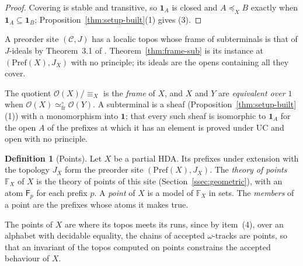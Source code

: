 \documentclass{lmcs}
\theoremstyle{definition}
\newtheorem{definition}[theorem]{Definition}
\theoremstyle{remark}
\newcommand{\Op}{\mathcal{O}}
\newcommand{\prin}[1]{\mathrm{#1}}
\newcommand{\UC}{\prin{UC}}
\newcommand{\sbt}[1]{\mathbf{1}_{#1}}
\newcommand{\Pref}{\mathrm{Pref}}
\newcommand{\JX}[1]{J_{#1}}
\newcommand{\fle}[1]{\preceq_{#1}}
\newcommand{\feq}[1]{\equiv_{#1}}
\newcommand{\FX}[1]{\mathbb{F}_{#1}}
\newcommand{\fat}[1]{\mathsf{F}_{#1}}
\newcommand{\eqFrF}{\simeq^{\circ}_{\mathrm{fr}}}
\begin{document}
\begin{proof}
Covering is stable and transitive, so $\sbt{A}$ is closed and $A\fle{X}B$ exactly when
$\sbt{A}\subseteq\sbt{B}$;
Proposition~\ref{thm:setup-built}(1) gives (3).
\end{proof}

A preorder site $(\mathcal{C},J)$ has a localic topos \cite[Example~A4.6.2(e)]{Johnstone02} whose frame of
subterminals is that of $J$-ideals by Theorem~3.1 of
\cite{Caramello11}. Theorem~\ref{thm:frame-sub} is
its instance at $(\Pref(X),\JX{X})$ with no principle; its ideals are the opens containing all they cover.

The quotient $\Op(X)/{\feq{X}}$ is the \emph{frame} of $X$, and $X$ and $Y$ are \emph{equivalent over $1$} when
$\Op(X)\eqFrF\Op(Y)$. A subterminal is a sheaf (Proposition~\ref{thm:setup-built}(1)) with a monomorphism into
$\mathbf{1}$; that every such sheaf is isomorphic to
$\sbt{A}$ for the open $A$ of the prefixes at which it has an element is proved under $\UC$ and open with no
principle.

\begin{definition}[Points]\label{def:points-theory}\label{def:points}
Let $X$ be a partial HDA. Its prefixes under extension with the topology $\JX{X}$ form the preorder site
$(\Pref(X),\JX{X})$. The \emph{theory of points} $\FX{X}$ of $X$ is the theory of points of
this site (Section~\ref{ssec:geometric}), with an atom $\fat{p}$ for each prefix $p$. A \emph{point} of $X$ is a model of
$\FX{X}$ in sets. The \emph{members} of a point are the prefixes whose atoms it makes
true.
\end{definition}

The points of $X$ are where its topos meets its runs, since by item~(4), over an alphabet with decidable equality, the chains of
accepted $\omega$-tracks are points, so that an invariant of the topos computed on points constrains the accepted behaviour of $X$.
\end{document}
